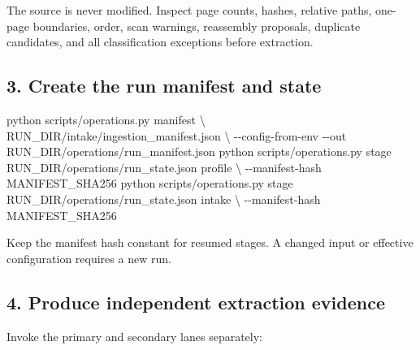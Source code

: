 \documentclass[
]{article}
\newenvironment{Shaded}{}{}
\newcommand{\AttributeTok}[1]{\textcolor[rgb]{0.49,0.56,0.16}{#1}}
\newcommand{\DataTypeTok}[1]{\textcolor[rgb]{0.56,0.13,0.00}{#1}}
\newcommand{\ExtensionTok}[1]{#1}
\newcommand{\NormalTok}[1]{#1}
\begin{document}
The source is never modified. Inspect page counts, hashes, relative
paths, one-page boundaries, order, scan warnings, reassembly proposals,
duplicate candidates, and all classification exceptions before
extraction.

\subsection{3. Create the run manifest and
state}\label{create-the-run-manifest-and-state}

\begin{Shaded}
\begin{Highlighting}[]
\ExtensionTok{python}\NormalTok{ scripts/operations.py manifest }\DataTypeTok{\textbackslash{}}
\NormalTok{  RUN\_DIR/intake/ingestion\_manifest.json }\DataTypeTok{\textbackslash{}}
  \AttributeTok{{-}{-}config{-}from{-}env} \AttributeTok{{-}{-}out}\NormalTok{ RUN\_DIR/operations/run\_manifest.json}
\ExtensionTok{python}\NormalTok{ scripts/operations.py stage RUN\_DIR/operations/run\_state.json profile }\DataTypeTok{\textbackslash{}}
  \AttributeTok{{-}{-}manifest{-}hash}\NormalTok{ MANIFEST\_SHA256}
\ExtensionTok{python}\NormalTok{ scripts/operations.py stage RUN\_DIR/operations/run\_state.json intake }\DataTypeTok{\textbackslash{}}
  \AttributeTok{{-}{-}manifest{-}hash}\NormalTok{ MANIFEST\_SHA256}
\end{Highlighting}
\end{Shaded}

Keep the manifest hash constant for resumed stages. A changed input or
effective configuration requires a new run.

\subsection{4. Produce independent extraction
evidence}\label{produce-independent-extraction-evidence}

Invoke the primary and secondary lanes separately:
\end{document}
